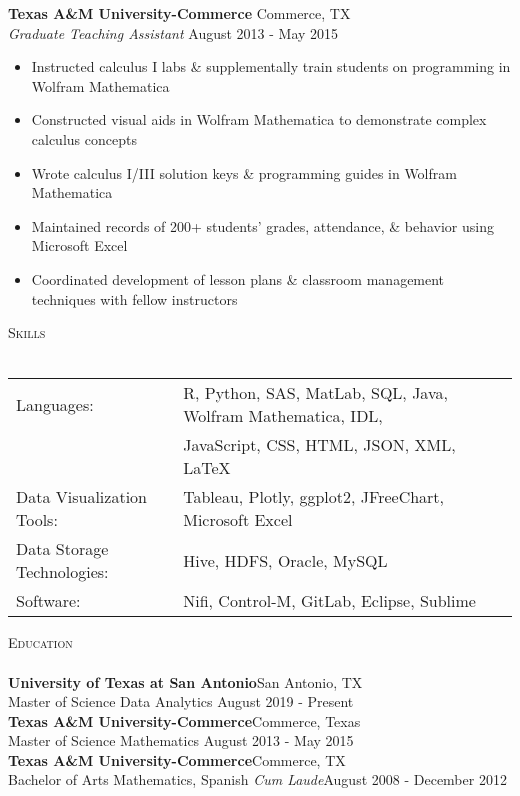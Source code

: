 \documentclass[a4paper]{article}
\newcommand{\lineunder} {
    \vspace*{-8pt} \\
    \hspace*{-18pt} \hrulefill \\
}
\newcommand{\header} [1] {
    {\hspace*{-18pt}\vspace*{6pt} \textsc{#1}}
    \vspace*{-6pt} \lineunder
}
\begin{document}
\textbf{Texas A\&M University-Commerce} \hfill Commerce, TX\\
\textit{Graduate Teaching Assistant} \hfill August 2013 - May 2015\\
\vspace{-1mm}
\begin{itemize} \itemsep .5pt
	\item Instructed calculus I labs \& supplementally train students on programming in Wolfram Mathematica
	\item Constructed visual aids in Wolfram Mathematica to demonstrate complex calculus concepts
	\item Wrote calculus I/III solution keys \& programming guides in Wolfram Mathematica
	\item Maintained records of 200+ students’ grades, attendance, \& behavior using Microsoft Excel
	\item Coordinated development of lesson plans \& classroom management techniques with fellow instructors
\end{itemize}

\header{Skills}
\begin{tabular}{ l l }
	Languages: & R, Python, SAS, MatLab, SQL, Java, Wolfram Mathematica, IDL,\\
								& JavaScript, CSS, HTML, JSON, XML, LaTeX \\
	Data Visualization Tools:             & Tableau, Plotly, ggplot2, JFreeChart, Microsoft Excel                                       \\
	Data Storage Technologies:            & Hive, HDFS, Oracle, MySQL                                                                     \\
	Software:                             & Nifi, Control-M, GitLab, Eclipse, Sublime                                            \\
\end{tabular}
\vspace{2mm}

\header{Education}
\textbf{University of Texas at San Antonio}\hfill San Antonio, TX\\
Master of Science Data Analytics \hfill August 2019 - Present\\
\vspace{2mm}
\textbf{Texas A\&M University-Commerce}\hfill Commerce, Texas\\
Master of Science Mathematics \hfill August 2013 - May 2015\\
\vspace{2mm}
\textbf{Texas A\&M University-Commerce}\hfill Commerce, TX\\
Bachelor of Arts Mathematics, Spanish \textit{Cum Laude}\hfill August 2008 - December 2012\\
\vspace{2mm}
\end{document}
